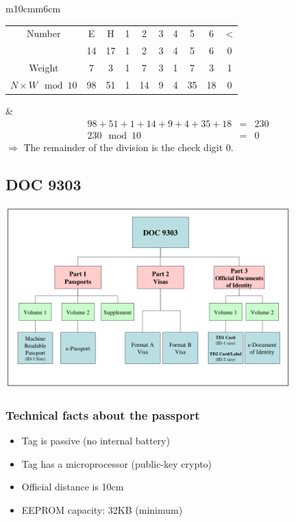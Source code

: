 \begin{tabular}{m{10cm}m{6cm}}
    \begin{tabular}{|c|c|c|c|c|c|c|c|c|c|}
        \hline
        Number & E & H & 1 & 2 & 3 & 4 & 5 & 6 & < \\
        & 14 & 17 & 1 & 2 & 3 & 4 & 5 & 6 & 0 \\
        \hline
        Weight & 7 & 3 & 1 & 7 & 3 & 1 & 7 & 3 & 1\\
        \hline
        $N\times W \mod{10}$ & 98 & 51 & 1 & 14 & 9 & 4 & 35 & 18 & 0\\
        \hline
    \end{tabular}
    &
    \begin{eqnarray*}
        98+51+1+14+9+4+35+18 &=& 230 \\
        230 \mod 10 &=& 0 
        \end{eqnarray*}
        $\Rightarrow$ The remainder of the division is the check digit $0$.
\end{tabular}

\subsection{DOC 9303}

\begin{center}
    \includegraphics[width=11cm]{img/9303.png}
    \end{center}

\subsubsection{Technical facts about the passport}
\begin{itemize}
    \item Tag is passive (no internal battery)
    \item Tag has a microprocessor (public-key crypto)
    \item Official distance is 10cm
    \item EEPROM capacity: 32KB (minimum)
\end{itemize}

